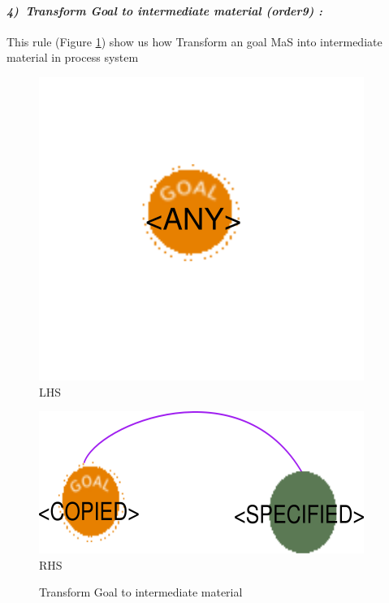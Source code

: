 \paragraph{\emph{4)~Transform Goal to intermediate material (order9) :} }
 
 
This rule (Figure \ref{fig:Transform Goal to intermediate material}) 
show us how Transform  an goal MaS into intermediate material in process system

\vspace{1cm}
\begin{figure}[th]

\centering
\begin{minipage}{.5\textwidth}
  \begin{center}
  \includegraphics[width=.8\linewidth]{chapiter3/img/L4}
  LHS
  \end{center}
  
\end{minipage}%
\begin{minipage}{.5\textwidth}
  \begin{center}
  \includegraphics[width=.8\linewidth]{chapiter3/img/R4}
  RHS 
  \end{center}
\end{minipage}
\caption{\label{fig:Transform Goal to intermediate material}Transform Goal to intermediate material}
 
\end{figure}
 

